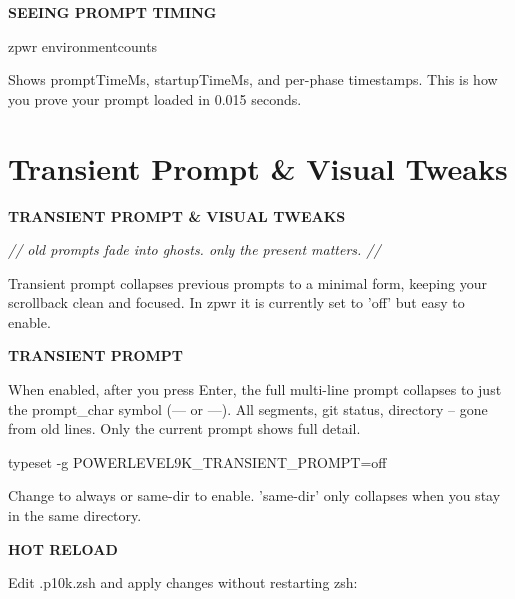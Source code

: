 \documentclass[11pt,a4paper,twoside]{book}
\begin{document}
\vspace{12pt}
{\bfseries\color{neonyellow} SEEING \textbf{PROMPT} TIMING}\vspace{4pt}

\begin{codebox}
\color{neongreen}zpwr environmentcounts\\
\end{codebox}

Shows promptTimeMs, startupTimeMs, and per-phase timestamps. This is how you prove your prompt loaded in 0.015 seconds.


\vspace{16pt}

\section{Transient Prompt \& Visual Tweaks}


\vspace{10pt}
{\large\bfseries\color{neoncyan} TRANSIENT PROMPT \& VISUAL TWEAKS}\vspace{6pt}

{\small\itshape\color{dimtext} // old prompts fade into ghosts. only the present matters. //}

Transient prompt collapses previous prompts to a minimal form, keeping your scrollback clean and focused. In zpwr it is currently set to 'off' but easy to enable.


\vspace{12pt}
{\bfseries\color{neonyellow} TRANSIENT \textbf{PROMPT}}\vspace{4pt}

When enabled, after you press Enter, the full multi-line prompt collapses to just the prompt\_char symbol (--- or ---). All segments, git status, directory -- gone from old lines. Only the current prompt shows full detail.

\begin{codebox}
\color{neongreen}typeset -g POWERLEVEL9K\_TRANSIENT\_PROMPT=off\\
\end{codebox}

Change to always or same-dir to enable. 'same-dir' only collapses when you stay in the same directory.


\vspace{12pt}
{\bfseries\color{neonyellow} HOT RELOAD}\vspace{4pt}

Edit .p10k.zsh and apply changes without restarting zsh:
\end{document}
